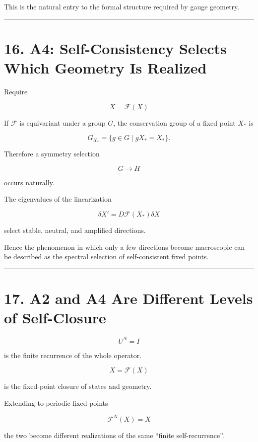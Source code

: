 \documentclass[
  a4paper,
]{article}
\begin{document}
This is the natural entry to the formal structure required by gauge
geometry.

\begin{center}\rule{0.5\linewidth}{0.5pt}\end{center}

\section{16. A4: Self-Consistency Selects Which Geometry Is
Realized}\label{a4-self-consistency-selects-which-geometry-is-realized}

Require

\[
\boxed{
X=\mathcal F(X)
}
\]

If \(\mathcal F\) is equivariant under a group \(G\), the conservation
group of a fixed point \(X_*\) is

\[
\boxed{
G_{X_*}
=
\{g\in G\mid gX_*=X_*\}
}.
\]

Therefore a symmetry selection

\[
\boxed{
G\to H
}
\]

occurs naturally.

The eigenvalues of the linearization

\[
\delta X'
=
D\mathcal F(X_*)\delta X
\]

select stable, neutral, and amplified directions.

Hence the phenomenon in which only a few directions become macroscopic
can be described as the spectral selection of self-consistent fixed
points.

\begin{center}\rule{0.5\linewidth}{0.5pt}\end{center}

\section{17. A2 and A4 Are Different Levels of
Self-Closure}\label{a2-and-a4-are-different-levels-of-self-closure}

\[
U^N=I
\]

is the finite recurrence of the whole operator.

\[
X=\mathcal F(X)
\]

is the fixed-point closure of states and geometry.

Extending to periodic fixed points

\[
\mathcal F^N(X)=X
\]

the two become different realizations of the same ``finite
self-recurrence''.
\end{document}
